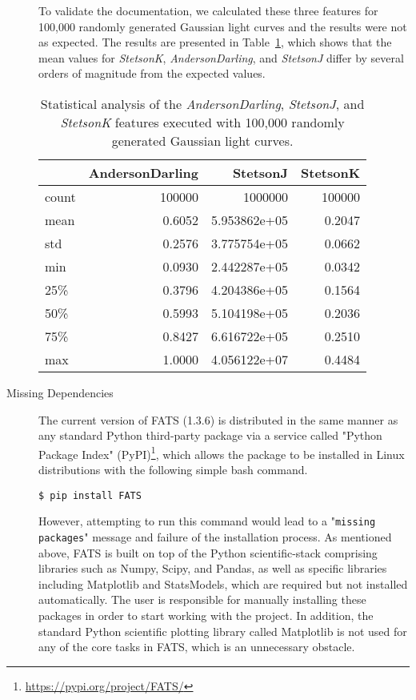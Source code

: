 \documentclass[final,5p,times,twocolumn,authoryear]{elsarticle}
\begin{document}
\begin{description}
To validate the documentation, we calculated these three features for 
100,000 randomly generated Gaussian light curves and the results were 
not as expected. 
%
The results are presented in Table~\ref{tab:100kmontecarlo}, which
shows that the mean values for 
\textit{StetsonK},%
\textit{AndersonDarling}, %
and \textit{StetsonJ} differ by several orders of magnitude from the expected values.
%
\begin{table}
\begin{tabular}{lrrr}
{} &  AndersonDarling &      StetsonJ &    StetsonK \\
\hline
count &           100000 &  1000000      &      100000 \\
mean  &           0.6052 &  5.953862e+05 &      0.2047 \\
std   &           0.2576 &  3.775754e+05 &      0.0662 \\
min   &           0.0930 &  2.442287e+05 &      0.0342 \\
25\%   &           0.3796 &  4.204386e+05 &      0.1564 \\
50\%   &           0.5993 &  5.104198e+05 &      0.2036 \\
75\%   &           0.8427 &  6.616722e+05 &      0.2510 \\
max   &           1.0000 &  4.056122e+07 &      0.4484 \\
\end{tabular}
\caption{Statistical analysis of the \textit{AndersonDarling}, \textit{StetsonJ}, and \textit{StetsonK} features executed with 100,000 randomly generated Gaussian light curves.}
\label{tab:100kmontecarlo}
\end{table}

\item [Missing Dependencies]

The current version of FATS (1.3.6) is distributed in the same manner as any standard Python third-party 
package via a service called "Python Package Index"
(PyPI)\footnote{\url{https://pypi.org/project/FATS/}}, 
which allows the package to be installed in Linux 
distributions with the following simple bash command.
\begin{verbatim}
$ pip install FATS
\end{verbatim}

However, attempting to run this command would lead to a "\texttt{missing packages}"
message and failure of the installation process. 
%
As mentioned above, FATS is built on top of the Python scientific-stack 
comprising libraries such as Numpy, Scipy, and Pandas, as well as specific libraries
including Matplotlib and StatsModels, which are required but not installed automatically.
The user is responsible for manually installing these packages in order to start 
working with the project. 
In addition, the standard Python scientific plotting library called Matplotlib is not used
for any of the core tasks in FATS, which is an unnecessary obstacle.


\end{description}
\end{document}
